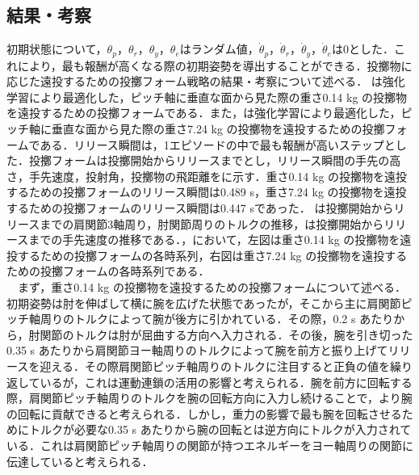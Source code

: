 \begin{small}
\subsection{結果・考察}
初期状態について，$\theta_{p}$，$\theta_{r}$，$\theta_{y}$，$\theta_{e}$はランダム値，$\dot{\theta}_{p}$，$\dot{\theta}_{r}$，$\dot{\theta}_{y}$，$\dot{\theta}_{e}$は0とした．これにより，最も報酬が高くなる際の初期姿勢を導出することができる．投擲物に応じた遠投するための投擲フォーム戦略の結果・考察について述べる．
は強化学習により最適化した，ピッチ軸に垂直な面から見た際の重さ0.14 kg の投擲物を遠投するための投擲フォームである．また，は強化学習により最適化した，ピッチ軸に垂直な面から見た際の重さ7.24 kg の投擲物を遠投するための投擲フォームである．リリース瞬間は，1エピソードの中で最も報酬が高いステップとした．投擲フォームは投擲開始からリリースまでとし，リリース瞬間の手先の高さ，手先速度，投射角，投擲物の飛距離をに示す．重さ0.14 kg の投擲物を遠投するための投擲フォームのリリース瞬間は0.489 s，重さ7.24 kg の投擲物を遠投するための投擲フォームのリリース瞬間は0.447 sであった．
は投擲開始からリリースまでの肩関節3軸周り，肘関節周りのトルクの推移，は投擲開始からリリースまでの手先速度の推移である．，において，左図は重さ0.14 kg の投擲物を遠投するための投擲フォームの各時系列，右図は重さ7.24 kg の投擲物を遠投するための投擲フォームの各時系列である．\\
　まず，重さ0.14 kg の投擲物を遠投するための投擲フォームについて述べる．初期姿勢は肘を伸ばして横に腕を広げた状態であったが，そこから主に肩関節ピッチ軸周りのトルクによって腕が後方に引かれている．その際，0.2 s あたりから，肘関節のトルクは肘が屈曲する方向へ入力される．その後，腕を引き切った0.35 s あたりから肩関節ヨー軸周りのトルクによって腕を前方と振り上げてリリースを迎える．その際肩関節ピッチ軸周りのトルクに注目すると正負の値を繰り返しているが，これは運動連鎖の活用の影響と考えられる．腕を前方に回転する際，肩関節ピッチ軸周りのトルクを腕の回転方向に入力し続けることで，より腕の回転に貢献できると考えられる．しかし，重力の影響で最も腕を回転させるためにトルクが必要な0.35 s あたりから腕の回転とは逆方向にトルクが入力されている．これは肩関節ピッチ軸周りの関節が持つエネルギーをヨー軸周りの関節に伝達していると考えられる．\\

\end{small}
